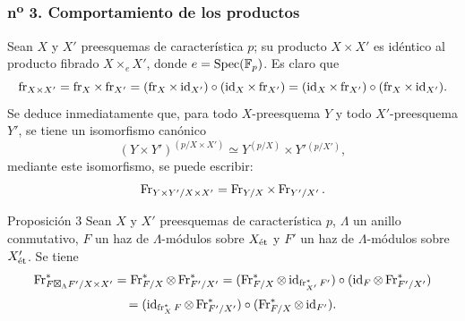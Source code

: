 \subsubsection*{n\textsuperscript{o} 3. Comportamiento de los productos}

Sean $X$ y $X'$ preesquemas de característica $p$; su producto $X\times X'$ es idéntico al producto fibrado $X\times_eX'$, donde $e=\operatorname{Spec}(\mathbb F_p)$. Es claro que
\[
\operatorname{fr}_{X\times X'}=\operatorname{fr}_X\times\operatorname{fr}_{X'}=(\operatorname{fr}_X\times\operatorname{id}_{X'})\circ(\operatorname{id}_X\times\operatorname{fr}_{X'})
=(\operatorname{id}_X\times\operatorname{fr}_{X'})\circ(\operatorname{fr}_X\times\operatorname{id}_{X'}).
\]
Se deduce inmediatamente que, para todo $X$-preesquema $Y$ y todo $X'$-preesquema $Y'$, se tiene un isomorfismo canónico
\[
(Y\times Y')^{(p/X\times X')}\simeq Y^{(p/X)}\times Y'{}^{(p/X')},
\]
mediante este isomorfismo, se puede escribir:
\[
\operatorname{Fr}_{Y\times Y'/X\times X'}=\operatorname{Fr}_{Y/X}\times\operatorname{Fr}_{Y'/X'}.
\]

\begin{statement}{Proposición 3}
Sean $X$ y $X'$ preesquemas de característica $p$, $\Lambda$ un anillo conmutativo, $F$ un haz de $\Lambda$-módulos sobre $X_{\mathrm{\acute{e}t}}$ y $F'$ un haz de $\Lambda$-módulos sobre $X'_{\mathrm{\acute{e}t}}$. Se tiene
\[
\operatorname{Fr}^*_{F\boxtimes_\Lambda F'/X\times X'}
=\operatorname{Fr}^*_{F/X}\otimes\operatorname{Fr}^*_{F'/X'}
=(\operatorname{Fr}^*_{F/X}\otimes\operatorname{id}_{\operatorname{fr}_{X'}^*F'})\circ
(\operatorname{id}_F\otimes\operatorname{Fr}^*_{F'/X'})
\]
\[
=(\operatorname{id}_{\operatorname{fr}_X^*F}\otimes\operatorname{Fr}^*_{F'/X'})\circ
(\operatorname{Fr}^*_{F/X}\otimes\operatorname{id}_{F'}).
\]
\end{statement}
